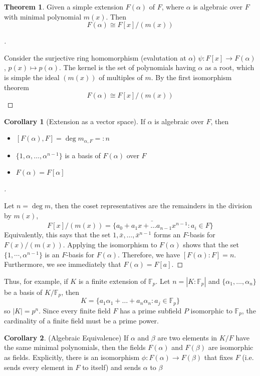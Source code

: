 \documentclass{article}
\theoremstyle{definition}
\newtheorem{thm}{Theorem}
\newtheorem{cor}{Corollary}
\newenvironment{proofs}[1][\proofname]{%
  \begin{proof}[#1]$ $\par\nobreak\ignorespaces
}{%
  \end{proof}
}
\newcommand{\FF}{\mathbb F}
\begin{document}
\begin{thm}
	Given a simple extension $F(\alpha)$ of $F$, where $\alpha$ is algebraic over $F$ with minimal polynomial $m(x)$. Then
	\[F(\alpha)\cong F[x]/(m(x))\]
\end{thm}

\begin{proofs}
	Consider the surjective ring homomorphism (evalutation at $\alpha$) $\psi: F[x]\to F(\alpha)$, $p(x)\mapsto p(\alpha)$. The kernel is the set of polynomials having $\alpha$ as a root, which is simple the ideal $(m(x))$ of multiples of $m$. By the first isomorphism theorem
	\[F(\alpha)\cong F[x]/(m(x))\]
\end{proofs}

\begin{cor}[Extension as a vector space]
	If $\alpha$ is algebraic over $F$, then
	\begin{itemize}
		\item $[F(\alpha),F]=\deg m_{\alpha,F}=:n$
		\item $\{1,\alpha,\dots, \alpha^{n-1}\}$ is a basis of $F(\alpha)$ over $F$
		\item $F(\alpha)=F[\alpha]$
	\end{itemize}
\end{cor}

\begin{proofs}
	Let $n=\deg m$, then the coset representatives are the remainders in the division by $m(x)$,
	\[F[x]/(m(x))=\{\bar{a_0+a_1x+\dots a_{n-1}x^{n-1}}: a_i \in F\}\]
	Equivalently, this says that the set ${1,\bar{x},\dots,\bar{x}^{n-1}}$ forms an $F$-basis for $F(x)/(m(x))$. Applying the isomorphism to $F(\alpha)$ shows that the set $\{1,\cdots,\alpha^{n-1}\}$ is an $F$-basis for $F(\alpha)$. Therefore, we have $[F(\alpha):F]=n$. Furthermore, we see immediately that $F(\alpha)=F[a]$.
\end{proofs}

Thus, for example, if $K$ is a finite extension of $\FF_p$. Let $n=|K:\FF_p|$ and $\{\alpha_1,\dots,\alpha_n\}$ be a basis of $K/\FF_p$, then
\[
	K=\{a_1\alpha_1+\dots+a_n \alpha_n : a_j \in \FF_p\}
\]
so $|K|=p^n$. Since every finite field $F$ has a prime subfield $P$ isomorphic to $\FF_p$, the cardinality of a finite field must be a prime power.


\begin{cor}(Algebraic Equivalence)
	If $\alpha$ and $\beta$ are two elements in $K/F$ have the same minimal polynomials, then the fields $F(\alpha)$ and $F(\beta)$ are isomorphic as fields. Explicitly, there is an isomorphism $\phi:F(\alpha)\to F(\beta)$ that fixes $F$ (i.e. sends every element in $F$ to itself) and sends $\alpha$ to $\beta$
\end{cor}
\end{document}
